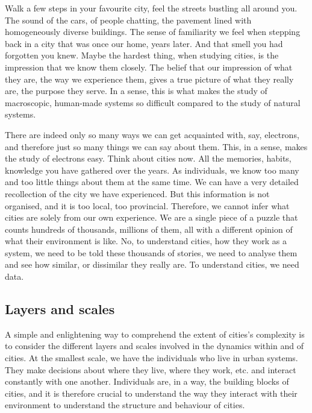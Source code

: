 Walk a few steps in your favourite city, feel the streets bustling all around
you. The sound of the cars, of people chatting, the pavement lined with
 homogeneously diverse buildings. The sense of familiarity we feel when stepping
back in a city that was once our home, years later. And that smell you had
forgotten you knew. Maybe the hardest thing, when studying cities, is the
impression that we know them closely. The belief that our impression of what
they are, the way we experience them, gives a true picture of what they really
are, the purpose they serve. In a sense, this is what makes the study of
macroscopic, human-made systems so difficult compared to the study of natural
systems. 

There are indeed only so many ways we can get acquainted with, say, electrons, and
therefore just so many things we can say about them. This, in a sense, makes the
study of electrons easy. Think about cities now. All the memories, habits,
knowledge you have gathered over the years. As individuals, we know too many and
too little things about them at the same time. We can have a very detailed
recollection of the city we have experienced. But this information is not
organised, and it is too local, too provincial. Therefore, we cannot infer what
cities are solely from our own experience.  We are a single piece of a puzzle
that counts hundreds of thousands, millions of them, all with a different
opinion of what their environment is like. No, to understand cities, how they
work as a system, we need to be told these thousands of stories, we need to
analyse them and see how similar, or dissimilar they really are. To understand
cities, we need data.\\


\subsection{Layers and scales}
\label{sub:layers_and_scales}

A simple and enlightening way to comprehend the extent of cities's complexity is
to consider the different layers and scales involved in the dynamics within and
of cities. At the smallest scale, we have the individuals who live in urban
systems. They make decisions about where they live, where they work, etc. and
interact constantly with one another. Individuals are, in a way, the building
blocks of cities, and it is therefore crucial to understand the way they
interact with their environment to understand the structure and behaviour of
cities.

